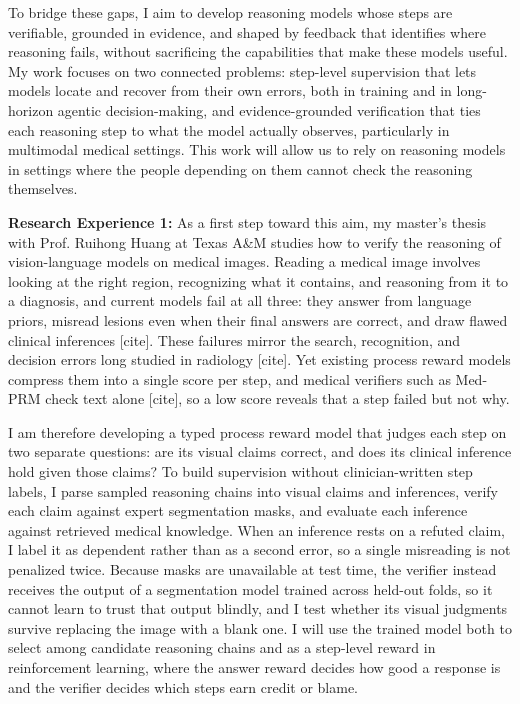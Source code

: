\documentclass{article}
\begin{document}
To bridge these gaps, I aim to develop reasoning models whose steps are verifiable, grounded in evidence, and shaped by feedback that identifies where reasoning fails, without sacrificing the capabilities that make these models useful. My work focuses on two connected problems: step-level supervision that lets models locate and recover from their own errors, both in training and in long-horizon agentic decision-making, and evidence-grounded verification that ties each reasoning step to what the model actually observes, particularly in multimodal medical settings. This work will allow us to rely on reasoning models in settings where the people depending on them cannot check the reasoning themselves.





\textbf{Research Experience 1:} As a first step toward this aim, my master’s thesis with Prof. Ruihong Huang at Texas A\&M studies how to verify the reasoning of vision-language models on medical images. Reading a medical image involves looking at the right region, recognizing what it contains, and reasoning from it to a diagnosis, and current models fail at all three: they answer from language priors, misread lesions even when their final answers are correct, and draw flawed clinical inferences [cite]. These failures mirror the search, recognition, and decision errors long studied in radiology [cite]. Yet existing process reward models compress them into a single score per step, and medical verifiers such as Med-PRM check text alone [cite], so a low score reveals that a step failed but not why.

I am therefore developing a typed process reward model that judges each step on two separate questions: are its visual claims correct, and does its clinical inference hold given those claims? To build supervision without clinician-written step labels, I parse sampled reasoning chains into visual claims and inferences, verify each claim against expert segmentation masks, and evaluate each inference against retrieved medical knowledge. When an inference rests on a refuted claim, I label it as dependent rather than as a second error, so a single misreading is not penalized twice. Because masks are unavailable at test time, the verifier instead receives the output of a segmentation model trained across held-out folds, so it cannot learn to trust that output blindly, and I test whether its visual judgments survive replacing the image with a blank one. I will use the trained model both to select among candidate reasoning chains and as a step-level reward in reinforcement learning, where the answer reward decides how good a response is and the verifier decides which steps earn credit or blame.
\end{document}
